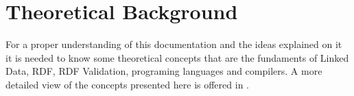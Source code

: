 \setchapterpreamble[u]{\margintoc}
\chapter{Theoretical Background}

For a proper understanding of this documentation and the ideas explained on it it is needed to know some theoretical concepts that are the fundaments of Linked Data, RDF, RDF Validation, programing languages and compilers. A more detailed view of the concepts presented here is offered in .








